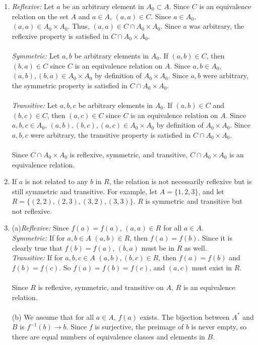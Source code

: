 \documentclass{article}
\begin{document}
\begin{enumerate}
(e) (i) The composition of injective functions is injective. 
\\(ii) The composition of surjective functions is surjective. 
\\(iii) If $g \circ f$ is injective, $f$ must be injective.
\\(iv) If $g \circ f$ is surjective, $g$ must be surjective.
\item
\textit{Reflexive:} Let $a$ be an arbitrary element in $A_0 \subset A$. Since $C$ is an equivalence relation on the set $A$ and $a \in A$, $(a,a) \in C$. Since $a \in A_0$, $(a,a) \in A_0\times A_0$. Thus, $(a,a) \in C \cap A_0\times A_0$. Since $a$ was arbitrary, the reflexive property is satisfied in $C \cap A_0\times A_0$.
\\\\ \textit{Symmetric:} Let $a,b$ be arbitrary elements in $A_0$. If $(a,b) \in C$, then $(b,a) \in C$ since $C$ is an equivalence relation on $A$. Since $a,b \in A_0$, $(a,b), (b,a) \in A_0\times A_0$ by definition of $A_0\times A_0$. Since $a,b$ were arbitrary, the symmetric property is satisfied in $C \cap A_0\times A_0$.
\\\\ \textit{Transitive:} Let $a,b,c$ be arbitrary elements in $A_0$. If $(a,b) \in C$ and $(b,c) \in C$, then $(a,c) \in C$ since $C$ is an equivalence relation on $A$. Since $a,b,c \in A_0$, $(a,b), (b,c), (a,c) \in A_0\times A_0$ by definition of $A_0\times A_0$. Since $a,b,c$ were arbitrary, the transitive property is satisfied in $C \cap A_0\times A_0$.
\\\\ Since $C \cap A_0 \times A_0$ is reflexive, symmetric, and transitive, $C \cap A_0 \times A_0$ is an equivalence relation. 



\item
If $a$ is not related to any $b$ in $R$, the relation is not necessarily reflexive but is still symmetric and transitive. For example, let $A = \{1,2,3\}$, and let $R = \{(2,2),(2,3),(3,2),(3,3)\}$. $R$ is symmetric and transitive but not reflexive.


\item
(a)\textit{Reflexive:} Since $f(a) = f(a)$, $(a,a) \in R$ for all $a \in A$. 
\\\textit{Symmetric:} If for $a,b \in A$ $(a,b) \in R$, then $f(a)=f(b)$. Since it is clearly true that $f(b)=f(a)$, $(b,a)$ must be in $R$ as well.
\\\textit{Transitive:} If for $a,b,c \in A$ $(a,b),(b,c) \in R$, then $f(a)=f(b)$ and $f(b)=f(c)$. So $f(a)=f(b)=f(c)$, and $(a,c)$ must exist in $R$.
\\\\ Since $R$ is reflexive, symmetric, and transitive on $A$, $R$ is an equivalence relation. 
\\\\(b) We assume that for all $a \in A$, $f(a)$ exists. The bijection between $A^*$ and $B$ is $f^{-1}(b) \rightarrow b$. Since $f$ is surjective, the preimage of $b$ is never empty, so there are equal numbers of equivalence classes and elements in $B$.


\end{enumerate}
\end{document}
